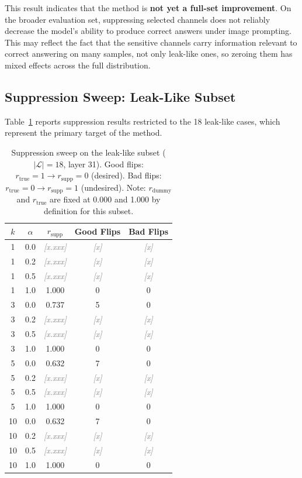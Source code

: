 \documentclass[12pt, a4paper]{article}
\newcommand{\placeholder}[1]{\textcolor{gray}{\textit{[#1]}}}
\begin{document}
This result indicates that the method is \textbf{not yet a full-set improvement}.
On the broader evaluation set, suppressing selected channels does not reliably decrease
the model's ability to produce correct answers under image prompting.
This may reflect the fact that the sensitive channels carry information relevant to
correct answering on many samples, not only leak-like ones, so zeroing them has mixed
effects across the full distribution.

\subsection{Suppression Sweep: Leak-Like Subset}

Table~\ref{tab:sweep_leak} reports suppression results restricted to the 18 leak-like
cases, which represent the primary target of the method.

\begin{table}[h]
\centering
\caption{Suppression sweep on the leak-like subset ($|\mathcal{L}| = 18$, layer 31).
Good flips: $r_{\text{true}}=1 \to r_{\text{supp}}=0$ (desired).
Bad flips: $r_{\text{true}}=0 \to r_{\text{supp}}=1$ (undesired).
Note: $r_{\text{dummy}}$ and $r_{\text{true}}$ are fixed at 0.000 and 1.000
by definition for this subset.}
\label{tab:sweep_leak}
\begin{tabular}{ccccc}
\toprule
$k$ & $\alpha$ & $r_{\text{supp}}$ & Good Flips & Bad Flips \\
\midrule
 1 & 0.0 & \placeholder{x.xxx} & \placeholder{x} & \placeholder{x} \\
 1 & 0.2 & \placeholder{x.xxx} & \placeholder{x} & \placeholder{x} \\
 1 & 0.5 & \placeholder{x.xxx} & \placeholder{x} & \placeholder{x} \\
 1 & 1.0 & 1.000 & 0 & 0 \\
\midrule
 3 & 0.0 & 0.737 & 5 & 0 \\
 3 & 0.2 & \placeholder{x.xxx} & \placeholder{x} & \placeholder{x} \\
 3 & 0.5 & \placeholder{x.xxx} & \placeholder{x} & \placeholder{x} \\
 3 & 1.0 & 1.000 & 0 & 0 \\
\midrule
 5 & 0.0 & 0.632 & 7 & 0 \\
 5 & 0.2 & \placeholder{x.xxx} & \placeholder{x} & \placeholder{x} \\
 5 & 0.5 & \placeholder{x.xxx} & \placeholder{x} & \placeholder{x} \\
 5 & 1.0 & 1.000 & 0 & 0 \\
\midrule
10 & 0.0 & 0.632 & 7 & 0 \\
10 & 0.2 & \placeholder{x.xxx} & \placeholder{x} & \placeholder{x} \\
10 & 0.5 & \placeholder{x.xxx} & \placeholder{x} & \placeholder{x} \\
10 & 1.0 & 1.000 & 0 & 0 \\
\bottomrule
\end{tabular}
\end{table}
\end{document}
